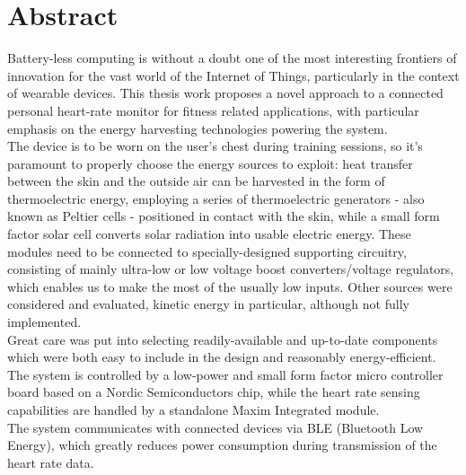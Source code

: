 \chapter*{Abstract}
\label{cha:abtract}

Battery-less computing is without a doubt one of the most interesting frontiers
of innovation for the vast world of the Internet of Things, particularly in the context
of wearable devices. This thesis work proposes a novel approach to a connected
personal heart-rate monitor for fitness related applications, with particular emphasis
on the energy harvesting technologies powering the system.\\ The device is to be
worn on the user's chest during training sessions, so it's paramount to properly
choose the energy sources to exploit: heat transfer between the skin and the outside
air can be harvested in the form of thermoelectric energy, employing a series of
thermoelectric generators - also known as Peltier cells - positioned in contact
with the skin, while a small form factor solar cell converts solar radiation into
usable electric energy. These modules need to be connected to specially-designed
supporting circuitry, consisting of mainly ultra-low or low voltage boost converters/voltage
regulators, which enables us to make the most of the usually low inputs. Other sources
were considered and evaluated, kinetic energy in particular, although not fully implemented.\\
Great care was put into selecting readily-available and up-to-date components which
were both easy to include in the design and reasonably energy-efficient. The
system is controlled by a low-power and small form factor micro controller board
based on a Nordic Semiconductors chip, while the heart rate sensing capabilities
are handled by a standalone Maxim Integrated module.\\ The system communicates with
connected devices via BLE (Bluetooth Low Energy), which greatly reduces power
consumption during transmission of the heart rate data.
